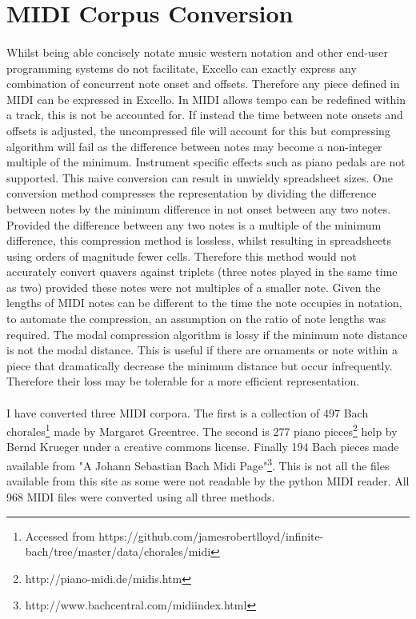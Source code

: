 \section{MIDI Corpus Conversion}

\paragraph{} Whilst being able concisely notate music western notation and other end-user programming systems do not facilitate, Excello can exactly express any combination of concurrent note onset and offsets. Therefore any piece defined in MIDI can be expressed in Excello. In MIDI allows tempo can be redefined within a track, this is not be accounted for. If instead the time between note onsets and offsets is adjusted, the uncompressed file will account for this but compressing algorithm will fail as the difference between notes may become a non-integer multiple of the minimum. Instrument specific effects such as piano pedals are not supported. This naive conversion can result in unwieldy spreadsheet sizes. One conversion method compresses the representation by dividing the difference between notes by the minimum difference in not onset between any two notes. Provided the difference between any two notes is a multiple of the minimum difference, this compression method is lossless, whilst resulting in spreadsheets using orders of magnitude fewer cells. Therefore this method would not accurately convert quavers against triplets (three notes played in the same time as two) provided these notes were not multiples of a smaller note. Given the lengths of MIDI notes can be different to the time the note occupies in notation, to automate the compression, an assumption on the ratio of note lengths was required. The modal compression algorithm is lossy if the minimum note distance is not the modal distance. This is useful if there are ornaments or note within a piece that dramatically decrease the minimum distance but occur infrequently. Therefore their loss may be tolerable for a more efficient representation.

\paragraph{} I have converted three MIDI corpora. The first is a collection of 497 Bach chorales\footnote{Accessed from https://github.com/jamesrobertlloyd/infinite-bach/tree/master/data/chorales/midi} made by Margaret Greentree. The second is 277 piano pieces\footnote{http://piano-midi.de/midis.htm} help by Bernd Krueger  under a creative commons license. Finally 194 Bach pieces made available from "A Johann Sebastian Bach Midi Page"\footnote{http://www.bachcentral.com/midiindex.html}. This is not all the files available from this site as some were not readable by the python MIDI reader. All 968 MIDI files were converted using all three methods.

